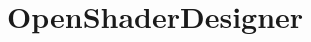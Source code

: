 \chapter{Open\+Shader\+Designer}
\hypertarget{md__r_e_a_d_m_e}{}\label{md__r_e_a_d_m_e}
\label{md__r_e_a_d_m_e_autotoc_md0}%
%
